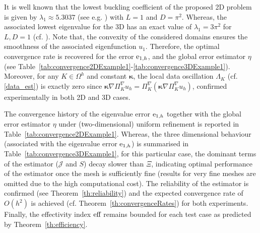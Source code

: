 \documentclass[final,reqno]{elsarticle}
\newcommand\cJ{\mathcal{J}}
\def\bkappa{\boldsymbol{\kappa}}
\begin{document}
It is well known that the lowest buckling coefficient of the proposed 2D problem is given by $\lambda_1 \approx 5.3037$ (see e.g. \cite{MR2009}) with $L=1$ and $D=\pi^2$. Whereas, the associated lowest eigenvalue for the 3D has an exact value of $\lambda_1 = 3\pi^2$ for $L,D=1$ (cf. \cite{DV_camwa2022}). Note that, the convexity of the considered domains ensures the smoothness of the associated eigenfunction $u_1$. Therefore, the optimal convergence rate is recovered for the error $\textnormal{e}_{1,h}$, and the global error estimator $\eta$ (see Table~\ref{tab:convergence2DExample1}-\ref{tab:convergence3DExample1}). Moreover, for any $K\in \Omega^h$ and constant $\bkappa$, the local data oscillation $\Lambda_K$ (cf. \eqref{data_est}) is exactly zero since $\bkappa \nabla \Pi_K^{\nabla} u_h=\Pi_K^{\nabla}(\bkappa \nabla \Pi_K^{\nabla} u_h)$, confirmed experimentally in both 2D and 3D cases.

The convergence history of the eigenvalue error $\textnormal{e}_{1,h}$ together with the global error estimator $\eta$ under (two-dimensional) uniform refinement is reported in Table~\ref{tab:convergence2DExample1}. Whereas, the three dimensional behaviour (associated with the eigenvalue error $\textnormal{e}_{1,h}$) is summarised in Table~\ref{tab:convergence3DExample1}, for this particular case, the dominant terms of the estimator ($\cJ$ and $S$) decay slower than $\Xi$, indicating optimal performance of the estimator once the mesh is sufficiently fine (results for very fine meshes are omitted due to the high computational cost). The reliability of the estimator is confirmed (see Theorem~\ref{th:reliability}) and the expected convergence rate of $O(h^2)$ is achieved (cf. Theorem~\ref{th:convergenceRates}) for both experiments. Finally, the effectivity index $\textnormal{eff}$ remains bounded for each test case as predicted by Theorem~\ref{th:efficiency}.
\end{document}
